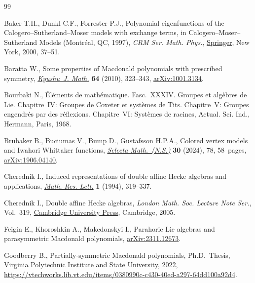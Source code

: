 \documentclass[pdftex]{sigma}
\theoremstyle{definition}
\numberwithin{equation}{section}
\begin{document}
\begin{thebibliography}{99}
\footnotesize\itemsep=0pt

Baker T.H., Dunkl C.F., Forrester P.J., Polynomial eigenfunctions of the
 {C}alogero--{S}utherland--{M}oser models with exchange terms, in
 Calogero--{M}oser--{S}utherland {M}odels ({M}ontr\'eal, {QC}, 1997), \textit{CRM Ser.
 Math. Phys.}, \href{https://doi.org/10.1007/978-1-4612-1206-5_3}{Springer}, New
 York, 2000, 37--51.

Baratta W., Some properties of {M}acdonald polynomials with prescribed
 symmetry, \href{https://doi.org/10.2206/kyushujm.64.323}{\textit{Kyushu~J.
 Math.}} \textbf{64} (2010), 323--343,
 \href{http://arxiv.org/abs/1001.3134}{arXiv:1001.3134}.

Bourbaki N., \'{E}l\'ements de math\'ematique. {F}asc.~{XXXIV}. {G}roupes et
 alg\`ebres de {L}ie. {C}hapitre~{IV}: {G}roupes de {C}oxeter et syst\`emes de
 {T}its. {C}hapitre~{V}: {G}roupes engendr\'es par des r\'eflexions.
 {C}hapitre~{VI}: {S}yst\`emes de racines, Actual. Sci. Ind., Hermann, Paris,
 1968.

Brubaker B., Buciumas V., Bump D., Gustafsson H.P.A., Colored vertex models and
 {I}wahori {W}hittaker functions,
 \href{https://doi.org/10.1007/s00029-024-00950-6}{\textit{Selecta
 Math.~(N.S.)}} \textbf{30} (2024), 78, 58~pages,
 \href{http://arxiv.org/abs/1906.04140}{arXiv:1906.04140}.

Cherednik I., Induced representations of double affine {H}ecke algebras and
 applications, \href{https://doi.org/10.4310/MRL.1994.v1.n3.a4}{\textit{Math.
 Res. Lett.}} \textbf{1} (1994), 319--337.

Cherednik I., Double affine {H}ecke algebras, \textit{London Math. Soc. Lecture
 Note Ser.}, Vol.~319,
 \href{https://doi.org/10.1017/CBO9780511546501}{Cambridge University Press},
 Cambridge, 2005.

Feigin E., Khoroshkin A., Makedonskyi I., Parahoric {L}ie algebras and
 parasymmetric {M}acdonald polynomials,
 \href{http://arxiv.org/abs/2311.12673}{arXiv:2311.12673}.

Goodberry B., Partially-symmetric {M}acdonald polynomials, Ph.D.~Thesis,
 {V}irginia Polytechnic Institute and State University, 2022,
 \url{https://vtechworks.lib.vt.edu/items/0380990c-c430-40ed-a297-64dd100a92d4}.


\end{thebibliography}
\end{document}
